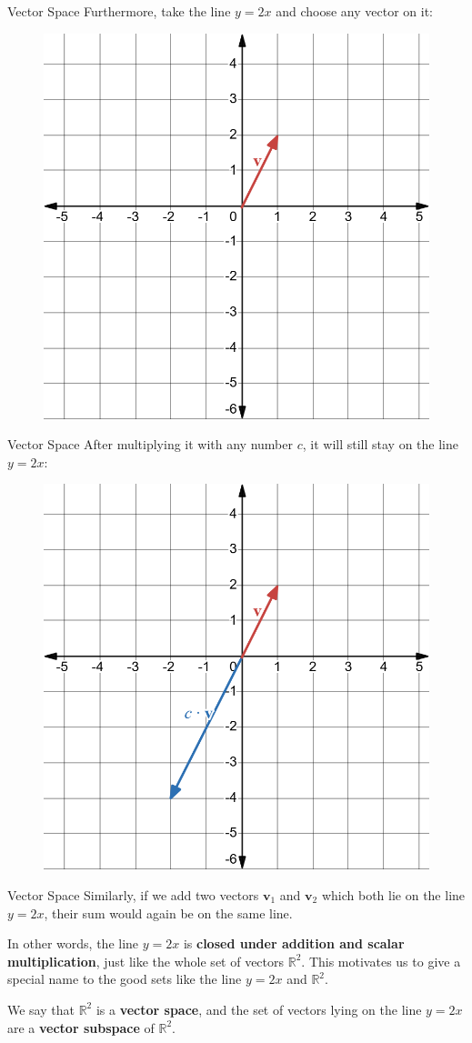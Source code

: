 \documentclass{beamer}
\newcommand{\vv}{\mathbf{v}}
\newcommand{\R}{\mathbb{R}}
\begin{document}
\begin{frame}{Vector Space}
Furthermore, take the line $y=2x$ and choose any  vector on it:
\begin{figure}
    \centering
    \includegraphics[width=0.5\linewidth]{y=2x 1.png}
\end{figure}

    
\end{frame}


\begin{frame}{Vector Space}
After multiplying it with any number $c$, it will still stay on the line $y=2x$:


\begin{figure}
    \centering
    \includegraphics[width=0.5\linewidth]{y=2x 2.png}
\end{figure}
    
\end{frame}





\begin{frame}{Vector Space}
Similarly, if we add two vectors $\vv_1$ and $\vv_2$ which both lie on the line $y=2x$, their sum would again be on the same line.

\pause

\bigskip 

In other words, the line $y=2x$ is \textbf{closed under addition and scalar multiplication}, just like the whole set of vectors $\R^2$. This motivates us to give a special name to the good sets like the line $y=2x$ and $\R^2$.

\pause

\bigskip

We say that $\R^2$ is a \textbf{vector space}, and the set of vectors lying on the line $y=2x$ are a \textbf{vector subspace} of $\R^2$.

\end{frame}
\end{document}
